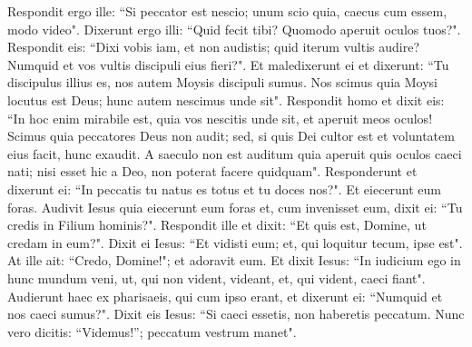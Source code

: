 \begin{biblechapter}
\verse Respondit ergo ille: “Si peccator est nescio; unum scio quia, caecus cum essem, modo video".  
\verse Dixerunt ergo illi: “Quid fecit tibi? Quomodo aperuit oculos tuos?". 
\verse Respondit eis: “Dixi vobis iam, et non audistis; quid iterum vultis audire? Numquid et vos vultis discipuli eius fieri?". 
\verse Et maledixerunt ei et dixerunt: “Tu discipulus illius es, nos autem Moysis discipuli sumus. 
\verse Nos scimus quia Moysi locutus est Deus; hunc autem nescimus unde sit". 
\verse Respondit homo et dixit eis: “In hoc enim mirabile est, quia vos nescitis unde sit, et aperuit meos oculos! 
\verse Scimus quia peccatores Deus non audit; sed, si quis Dei cultor est et voluntatem eius facit, hunc exaudit. 
\verse A saeculo non est auditum quia aperuit quis oculos caeci nati; 
\verse nisi esset hic a Deo, non poterat facere quidquam". 
\verse Responderunt et dixerunt ei: “In peccatis tu natus es totus et tu doces nos?". Et eiecerunt eum foras. 
\verse Audivit Iesus quia eiecerunt eum foras et, cum invenisset eum, dixit ei: “Tu credis in Filium hominis?". 
\verse Respondit ille et dixit: “Et quis est, Domine, ut credam in eum?". 
\verse Dixit ei Iesus: “Et vidisti eum; et, qui loquitur tecum, ipse est". 
\verse At ille ait: “Credo, Domine!"; et adoravit eum. 
\verse Et dixit Iesus: “In iudicium ego in hunc mundum veni, ut, qui non vident, videant, et, qui vident, caeci fiant". 
\verse Audierunt haec ex pharisaeis, qui cum ipso erant, et dixerunt ei: “Numquid et nos caeci sumus?".  
\verse Dixit eis Iesus: “Si caeci essetis, non haberetis peccatum. Nunc vero dicitis: “Videmus!”; peccatum vestrum manet". 
\end{biblechapter}

